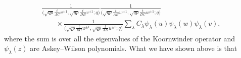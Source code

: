 \documentclass[a4paper,12pt]{article}
\begin{document}
\begin{gather*}
\frac1{\big(\sqrt{ q p} \frac{t}{AC} v^{\pm1},\sqrt{q p}\frac{t}{D B}v^{\pm1};q\big)}
\frac1{\big(\sqrt{q p} \frac{t}{AB}w^{\pm1},\sqrt{ q p} \frac{t}{D C} w^{\pm1};q\big)}\\
\qquad{}\times \frac1{\big(\sqrt{q p } \frac{t}{B C} u^{\pm1},\sqrt {q p }\frac{ t}{ A D } u^{\pm1};q\big)}
 \sum_{\lambda} C_\lambda \psi_\lambda(u)\psi_\lambda(w)\psi_\lambda(v) ,
\end{gather*} where the sum is over all the eigenvalues of the Koornwinder operator and $\psi_\lambda(z)$ are Askey--Wilson polynomials. What we have shown above is that
\end{document}
